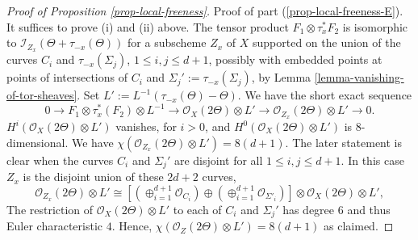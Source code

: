 \documentclass[12pt]{amsart}
\numberwithin{equation}{subsection}
\theoremstyle{plain}
\theoremstyle{definition}
\newcommand{\RightArrowOf}[1]{\stackrel{#1}{\rightarrow}}
\newcommand{\StructureSheaf}[1]{{\mathcal O}_{#1}}
\newcommand{\Pic}{{\rm Pic}}
\newcommand{\Ideal}[1]{{\mathcal I}_{#1}}
\begin{document}
\begin{proof}[Proof of Proposition \ref{prop-local-freeness}]
Proof of part (\ref{prop-local-freeness-E}).
It suffices to prove (i) and (ii) above.
The tensor product $F_1\otimes \tau_x^*F_2$ is isomorphic to $\Ideal{Z_x}(\Theta+\tau_{-x}(\Theta))$ for a subscheme $Z_x$ of $X$ supported on the union of the curves $C_i$ and $\tau_{-x}(\Sigma_j)$, $1\leq i,j\leq d+1$, possibly with embedded points at points of intersections of $C_i$ and $\Sigma_j':=\tau_{-x}(\Sigma_j)$, by Lemma \ref{lemma-vanishing-of-tor-sheaves}. 
Set $L':=L^{-1}(\tau_{-x}(\Theta)-\Theta)$.
We have the short exact sequence
\begin{equation}
\label{eq-short-exact-sequence-of-O-Z-x-twisted-by-line-bundle}
0\rightarrow F_1\otimes \tau_x^*(F_2)\otimes L^{-1}
\rightarrow \StructureSheaf{X}(2\Theta)\otimes L'\RightArrowOf{} \StructureSheaf{Z_x}(2\Theta)\otimes L'\rightarrow 0.
\end{equation}
$H^i(\StructureSheaf{X}(2\Theta)\otimes L')$ vanishes, for $i>0$, and $H^0(\StructureSheaf{X}(2\Theta)\otimes L')$ is $8$-dimensional. We have $\chi(\StructureSheaf{Z_x}(2\Theta)\otimes L')=8(d+1)$. The later statement is clear when the curves $C_i$ and $\Sigma_j'$ are disjoint for all $1\leq i,j \leq d+1$. In this case $Z_x$ is the disjoint union of these $2d+2$ curves,
\[
\StructureSheaf{Z_x}(2\Theta)\otimes L'\cong 
\left[
\left(\oplus_{i=1}^{d+1}\StructureSheaf{C_i}\right)
\oplus
\left(\oplus_{i=1}^{d+1}\StructureSheaf{\Sigma'_i}\right)\right]\otimes \StructureSheaf{X}(2\Theta)\otimes L',
\]
The restriction of $\StructureSheaf{X}(2\Theta)\otimes L'$ to each of $C_i$ and $\Sigma_j'$ has degree $6$ and thus Euler characteristic $4$. Hence, $\chi(\StructureSheaf{Z}(2\Theta)\otimes L')=8(d+1)$ as claimed.


\end{proof}
\end{document}
